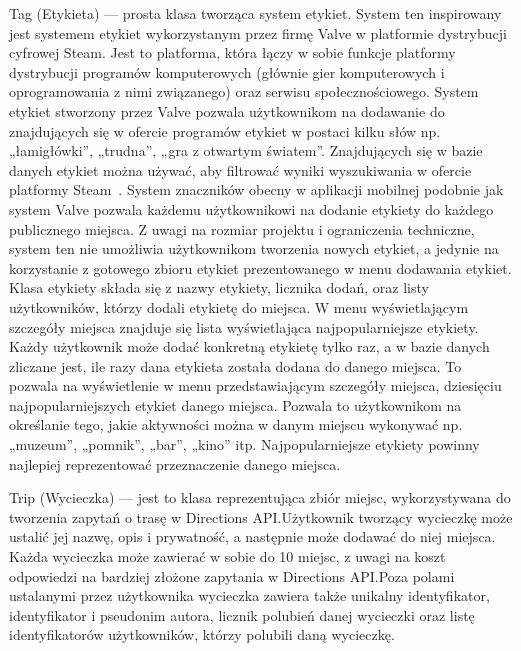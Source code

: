 		\noindent \newline Tag (Etykieta) — prosta klasa tworząca system etykiet. System ten inspirowany jest systemem etykiet wykorzystanym przez firmę Valve w platformie dystrybucji cyfrowej Steam.
		Jest to platforma, która łączy w sobie funkcje platformy dystrybucji programów komputerowych (głównie gier komputerowych i oprogramowania z nimi związanego) oraz serwisu społecznościowego.
		System etykiet stworzony przez Valve pozwala użytkownikom na dodawanie do znajdujących się w ofercie programów etykiet w postaci kilku słów np. „łamigłówki”, „trudna”, „gra z otwartym światem”.
		Znajdujących się w bazie danych etykiet można używać, aby filtrować wyniki wyszukiwania w ofercie platformy Steam~\cite{STEAM}. System znaczników obecny w aplikacji mobilnej podobnie jak system
		Valve pozwala każdemu użytkownikowi na dodanie etykiety do każdego publicznego miejsca. Z uwagi na rozmiar projektu i ograniczenia techniczne, system ten nie umożliwia użytkownikom tworzenia nowych
		etykiet, a jedynie na korzystanie z gotowego zbioru etykiet prezentowanego w menu dodawania etykiet. Klasa etykiety składa się z nazwy etykiety, licznika dodań, oraz listy użytkowników, którzy
		dodali etykietę do miejsca. W menu wyświetlającym szczegóły miejsca znajduje się lista wyświetlająca najpopularniejsze etykiety. Każdy użytkownik może dodać konkretną etykietę tylko raz, a 
		w bazie danych zliczane jest, ile razy dana etykieta została dodana do danego miejsca. To pozwala na wyświetlenie w menu przedstawiającym szczegóły miejsca, dziesięciu najpopularniejszych etykiet
		danego miejsca. Pozwala to użytkownikom na określanie tego, jakie aktywności można w danym miejscu wykonywać np. „muzeum”, „pomnik”, „bar”, „kino” itp. Najpopularniejsze etykiety powinny najlepiej
		reprezentować przeznaczenie danego miejsca.

		\noindent \newline Trip (Wycieczka) — jest to klasa reprezentująca zbiór miejsc, wykorzystywana do tworzenia zapytań o trasę w Directions API.\@ Użytkownik tworzący wycieczkę
		może ustalić jej nazwę, opis i prywatność, a następnie może dodawać do niej miejsca. Każda wycieczka może zawierać w sobie do 10 miejsc, z uwagi na koszt odpowiedzi na bardziej złożone zapytania
		w Directions API.\@ Poza polami ustalanymi przez użytkownika wycieczka zawiera także unikalny identyfikator, identyfikator i pseudonim autora, licznik polubień danej wycieczki oraz listę identyfikatorów 
		użytkowników, którzy polubili daną wycieczkę. \\

